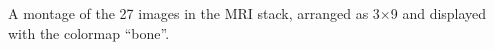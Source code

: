 \label{fig:mriMontage} A montage of the 27 images in the MRI stack, arranged as 3$\times$9 and displayed with the colormap ``bone''.